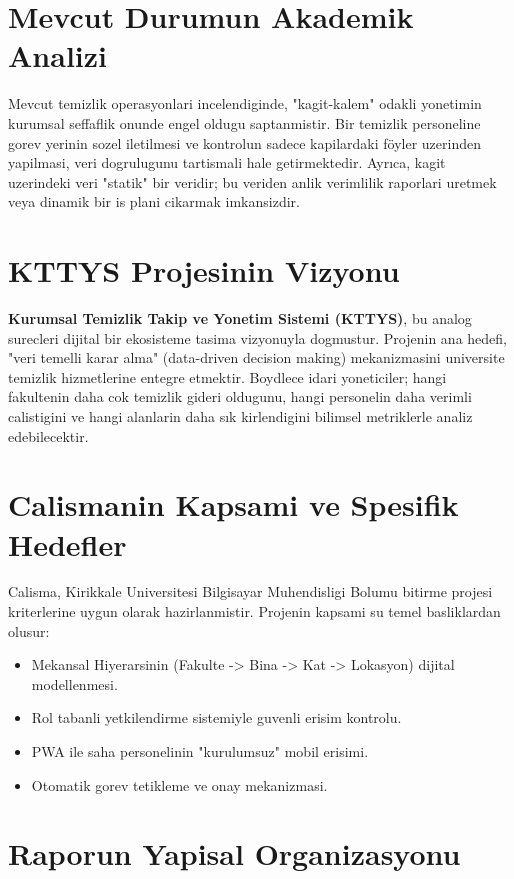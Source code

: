 \documentclass[12pt,a4paper,oneside]{report}
\begin{document}
\section{Mevcut Durumun Akademik Analizi}

Mevcut temizlik operasyonlari incelendiginde, "kagit-kalem" odakli yonetimin kurumsal seffaflik onunde engel oldugu saptanmistir. Bir temizlik personeline gorev yerinin sozel iletilmesi ve kontrolun sadece kapilardaki föyler uzerinden yapilmasi, veri dogrulugunu tartismali hale getirmektedir. Ayrıca, kagit uzerindeki veri "statik" bir veridir; bu veriden anlik verimlilik raporlari uretmek veya dinamik bir is plani cikarmak imkansizdir.

\section{KTTYS Projesinin Vizyonu}

\textbf{Kurumsal Temizlik Takip ve Yonetim Sistemi (KTTYS)}, bu analog surecleri dijital bir ekosisteme tasima vizyonuyla dogmustur. Projenin ana hedefi, "veri temelli karar alma" (data-driven decision making) mekanizmasini universite temizlik hizmetlerine entegre etmektir. Boydlece idari yoneticiler; hangi fakultenin daha cok temizlik gideri oldugunu, hangi personelin daha verimli calistigini ve hangi alanlarin daha sık kirlendigini bilimsel metriklerle analiz edebilecektir.

\section{Calismanin Kapsami ve Spesifik Hedefler}

Calisma, Kirikkale Universitesi Bilgisayar Muhendisligi Bolumu bitirme projesi kriterlerine uygun olarak hazirlanmistir. Projenin kapsami su temel basliklardan olusur:
\begin{itemize}
    \item Mekansal Hiyerarsinin (Fakulte -> Bina -> Kat -> Lokasyon) dijital modellenmesi.
    \item Rol tabanli yetkilendirme sistemiyle guvenli erisim kontrolu.
    \item PWA ile saha personelinin "kurulumsuz" mobil erisimi.
    \item Otomatik gorev tetikleme ve onay mekanizmasi.
\end{itemize}

\section{Raporun Yapisal Organizasyonu}
\end{document}
